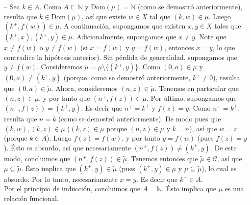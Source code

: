 \documentclass[10 pt]{article}
\begin{document}
\begin{itemize}
{    -- Sea $k \in A$. Como $A \subseteq \mathbb N$ y $\text{Dom}(\mu)=\mathbb N$ (como se demostró anteriormente), resulta que $k \in \text{Dom}(\mu)$, así que existe $w \in X$ tal que $(k,w) \in \mu$. Luego $(k^+,f(w)) \in \mu$. A continuación, supongamos que existen $x,y \in X$ tales que $(k^+,x),(k^+,y) \in \mu$. Adicionalmente, supongamos que $x \neq y$. Note que $x \neq f(w)$ o $y \neq f(w)$ (si $x=f(w)$ y $y=f(w)$, entonces $x=y$, lo que contradice la hipótesis anterior). Sin pérdida de generalidad, supongamos que $y \neq f(w)$. Consideremos $\tilde{\mu}=\mu \setminus \{(k^+,y)\}$. Como $(0,a) \in \mu$ y $(0,a) \neq (k^+,y)$ (porque, como se demostró anteriormente, $k^+ \neq 0$), resulta que $(0,a) \in \tilde{\mu}$. Ahora, consideremos $(n,z) \in \tilde{\mu}$. Tenemos en particular que $(n,z) \in \mu$, y por tanto que $(n^+,f(z)) \in \mu$. Por último, supongamos que $(n^+,f(z))=(k^+,y)$. Es decir que $n^+=k^+$ y $f(z)=y$. Como $n^+=k^+$, resulta que $n=k$ (como se demostró anteriormente). De modo pues que $(k,w),(k,z) \in \mu$ ($(k,z) \in \mu$ porque $(n,z) \in \mu$ y $k=n$), así que $w=z$ (porque $k \in A$). Luego $f(z)=f(w)$, y por tanto $y=f(w)$ (pues $f(z)=y$). Ésto es absurdo, así que necesariamente $(n^+,f(z)) \neq (k^+,y)$. De este modo, concluimos que $(n^+,f(z)) \in \tilde{\mu}$. Tenemos entonces que $\tilde{\mu} \in \mathcal C$, así que $\mu \subseteq \tilde{\mu}$. Ésto implica que $(k^+,y) \in \tilde{\mu}$ (pues $(k^+,y) \in \mu$ y $\mu \subseteq \tilde{\mu}$), lo cual es absurdo. Por lo tanto, necesariamente $x=y$. Es decir que $k^+ \in A$. \\

    Por el principio de inducción, concluimos que $A=\mathbb N$. Ésto implica que $\mu$ es una relación funcional.} \\
\end{itemize}
\end{document}

